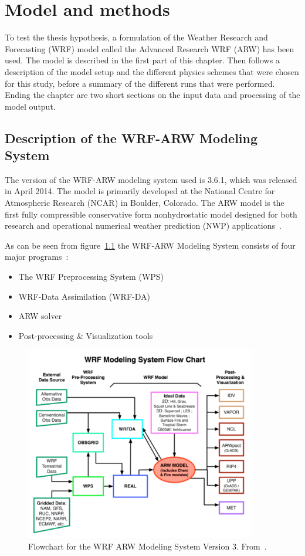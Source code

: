 \chapter{Model and methods}
\label{chap:modmet}
To test the thesis hypothesis, a formulation of the Weather Research and Forecasting (WRF) model called the Advanced Research WRF (ARW) has been used. The model is described in the first part of this chapter. Then follows a description of the model setup and the different physics schemes that were chosen for this study, before a summary of the different runs that were performed. Ending the chapter are two short sections on the input data and processing of the model output.

\section{Description of the WRF-ARW Modeling System}
\label{sec:modeldes}
The version of the WRF-ARW modeling system used is 3.6.1, which was released in April 2014. The model is primarily developed at the National Centre for Atmospheric Research (NCAR) in Boulder, Colorado. The ARW model is the first fully compressible conservative form nonhydrostatic model designed for both research and operational numerical weather prediction (NWP) applications~\citep{Skamarock2008}. 

As can be seen from figure~\ref{fig:wrfflowchart} the WRF-ARW Modeling System consists of four major programs~\citep{Wang2015}:
\begin{itemize}
\item The WRF Preprocessing System (WPS)
\item WRF-Data Assimilation (WRF-DA)
\item ARW solver
\item Post-processing \& Visualization tools
\end{itemize}

\begin{figure}[ht]
\centering
\includegraphics[width=0.9\textwidth]{model_methods/wrfflowchart}
\caption{Flowchart for the WRF ARW Modeling System Version 3. From~\citet{Wang2015}.}
\label{fig:wrfflowchart}
\end{figure}

